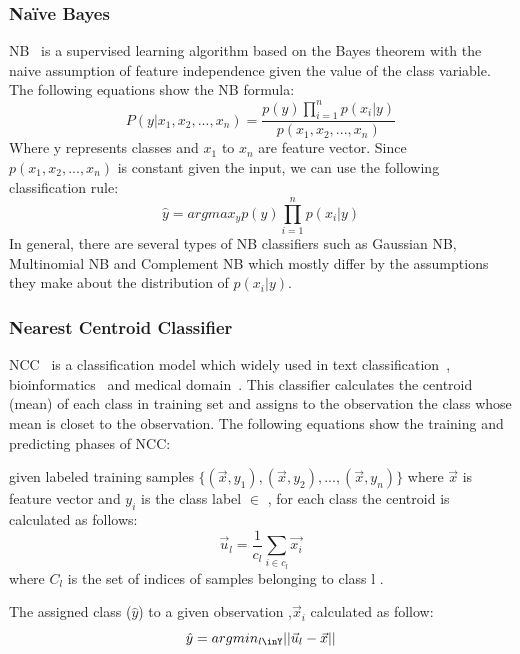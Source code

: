 \subsubsection{Naïve Bayes} 
NB~\citep{theodoridis1998pattern} is a supervised learning algorithm based on the Bayes theorem with the naive assumption of feature independence given the value of the class variable. The following equations show the NB formula:
\begin{equation}
    P(y|x_1,x_2,... , x_n) = \frac{p(y)\prod_{i=1}^{n}p(x_i|y)}{p(x_1,x_2,... , x_n)}
\end{equation}{}
Where y represents classes and $x_1$ to $x_n$ are feature vector. Since $p(x_1,x_2,... , x_n)$ is constant given the input, we can use the following classification rule: 
\begin{equation}
   \hat{y} = arg  max_{y}p(y) \prod_{i=1}^{n}p(x_i|y)
\end{equation}{}
In general, there are several types of NB classifiers such as Gaussian NB, Multinomial NB and Complement NB which mostly differ by the assumptions they make about the distribution of $p(x_i|y)$.
\subsubsection{Nearest Centroid Classifier}
NCC~\citep{tibshirani2003class} is a classification model which widely used in text classification~\citep{tan2008improved}, bioinformatics~\citep{levner2005feature} and medical domain~\citep{sharma2010improved}. This classifier calculates the centroid (mean) of each class in training set and assigns to the observation the class whose mean is closet to the observation. The following equations show the training and predicting phases of NCC:

 given labeled training samples $\{ ({\Vec{x}}, y_1), ({\Vec{x}}, y_2),..., ({\Vec{x}}, y_n) \}$ where $\Vec{x}$ is feature vector and $y_i$ is the class label $\in$ , for each class the centroid is calculated as follows:
\begin{equation}
   \Vec{u}_l =  \frac{1}{c_l} \sum_{i\in{c_l}}\Vec{x_i}
\end{equation}{}
where $C_l$ is the set of indices of samples belonging to class l \in {}.

 The assigned class ($\hat{y}$) to a given observation ,$\Vec{x}_i$ calculated as follow:
\begin{equation}
 \hat{y} = arg min_{l\inY} ||\Vec{u}_l - \vec{x}||
 \end{equation}{}

